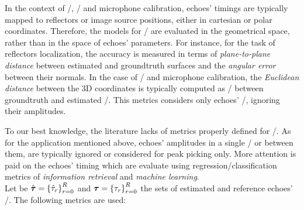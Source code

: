 \mynewline
In the context of \RooGE/, \SSL/ and microphone calibration, echoes' timings are typically mapped to reflectors or image source positions, either in cartesian or polar coordinates.
Therefore, the models for \AER/ are evaluated in the geometrical space, rather than in the space of echoes' parameters.
For instance, for the task of reflectors localization, the accuracy is measured in terms of \textit{plane-to-plane distance} between estimated and groundtruth surfaces and the \textit{angular error} between their normals.
In the case of \SSL/ and microphone calibration, the \textit{Euclidean distance} between the 3D coordinates is typically computed as \RMSEtxt/ between groundtruth and estimated \DOAs/.
This metrics considers only echoes' \TOA/, ignoring their amplitudes.

\mynewline
To our best knowledge, the literature lacks of metrics properly defined for \AER/.
As for the application mentioned above, echoes' amplitudes in a single \RIR/ or between them, are typically ignored or considered for peak picking only.
More attention is paid on the echoes' timing which are evaluate using regression/classification metrics of \textit{information retrieval} and \textit{machine learning}.
\\Let be $\hat{\boldsymbol{\tau}} = \kbrace{\hat{\tau}_\idxEch}_{\idxEch=0}^{\numEchs}$ and $\boldsymbol{\tau} = \kbrace{\tau_\idxEch}_{\idxEch=0}^{\numEchs}$ the sets of estimated and reference echoes' \TOAs/.
The following metrics are used:


